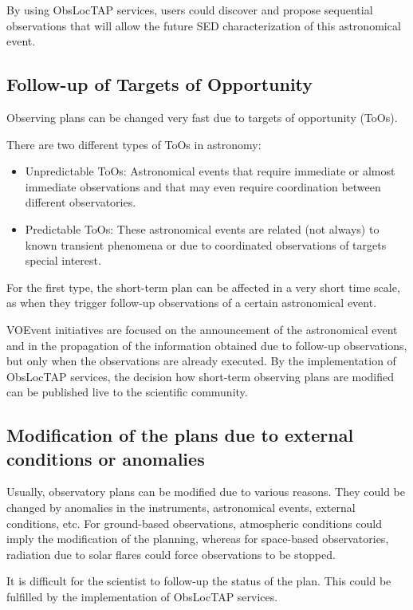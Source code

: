 \documentclass[11pt,a4paper]{ivoa}
\begin{document}
By using ObsLocTAP services, users could discover and propose sequential
observations that will allow the future SED characterization of this
astronomical event.

\subsection{Follow-up of Targets of Opportunity}
Observing plans can be changed very fast due to targets of opportunity (ToOs).

There are two different types of ToOs in astronomy:
\begin{itemize}
	\item{Unpredictable ToOs: Astronomical events that require immediate or almost
  immediate observations and that may even require coordination between
  different observatories.}

	\item{Predictable ToOs: These astronomical events are related (not always) to
  known transient phenomena or due to coordinated observations of targets
  special interest.}

\end{itemize}

For the first type, the short-term plan can be affected in a very short time
scale, as when they trigger follow-up observations of a certain astronomical
event.

VOEvent initiatives are focused on the announcement of the astronomical event
and in the propagation of the information obtained due to follow-up
observations, but only when the observations are already executed. By the
implementation of ObsLocTAP services, the decision how short-term observing
plans are modified can be published live to the scientific community.

\subsection{Modification of the plans due to external conditions or anomalies}
Usually, observatory plans can be modified due to various reasons. They could be
changed by anomalies in the instruments, astronomical events, external
conditions, etc.
For ground-based observations, atmospheric conditions could imply
the modification of the planning, whereas for space-based observatories,
radiation due to solar flares could force observations to be stopped.

It is difficult for the scientist to follow-up the status of the plan. This
could be fulfilled by the implementation of ObsLocTAP services.
\end{document}
